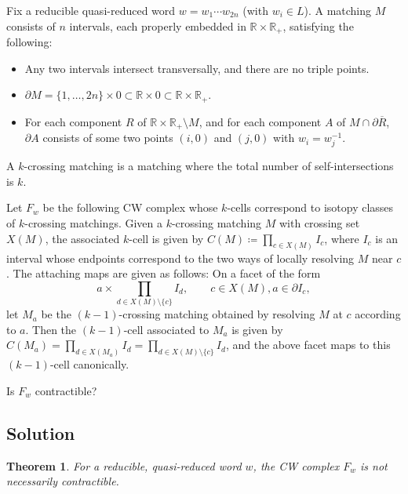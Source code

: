 \documentclass[12pt]{article}
\newtheorem{theorem}{Theorem}
\newcommand{\RR}{\mathbb{R}}
\newcommand{\bdy}{\partial}
\newcommand{\defeq}{\coloneqq}
\begin{document}
Fix a reducible quasi-reduced word $w=w_1\cdots w_{2n}$ (with $w_i\in L$). A
matching $M$ consists of $n$ intervals, each properly embedded in
$\RR\times\RR_+$, satisfying the following:
\begin{itemize}
\item Any two intervals intersect
  transversally, and there are no triple points.
\item $\bdy M=\{1,\dots,2n\}\times 0\subset\RR\times 0\subset
  \RR\times\RR_+$.
\item For each component $R$ of
  $\RR\times\RR_+\setminus M$, and for each component $A$ of $M\cap \bdy\overline{R}$, $\bdy A$ consists of some two points $(i,0)$ and $(j,0)$ with $w_i=w_j^{-1}$. 
\end{itemize}
A $k$-crossing
matching is a matching where the total number of self-intersections
is $k$.

Let $F_w$ be the following CW complex whose $k$-cells correspond to
isotopy classes of $k$-crossing matchings. Given a $k$-crossing
matching $M$ with crossing set $X(M)$, the associated $k$-cell is
given by $C(M)\defeq \prod_{c\in X(M)}I_c$, where $I_c$ is an
interval whose endpoints correspond to the two ways of locally
resolving $M$ near $c$. The attaching maps are given as follows: On
a facet of the form
\[
  a\times\prod_{d\in X(M)\setminus\{c\}}I_{d},\qquad c\in X(M),a\in \bdy I_c,
\]
let $M_a$ be the $(k-1)$-crossing matching obtained by resolving $M$
at $c$ according to $a$. Then the $(k-1)$-cell associated to $M_a$
is given by
$C(M_a)=\prod_{d\in X(M_a)}I_d=\prod_{d\in X(M)\setminus\{c\}}I_{d}$, and the
above facet maps to this $(k-1)$-cell canonically.

Is $F_w$ contractible?

\subsection*{Solution}

\begin{theorem}
For a reducible, quasi-reduced word $w$, the CW complex $F_w$ is not necessarily contractible.
\end{theorem}
\end{document}
